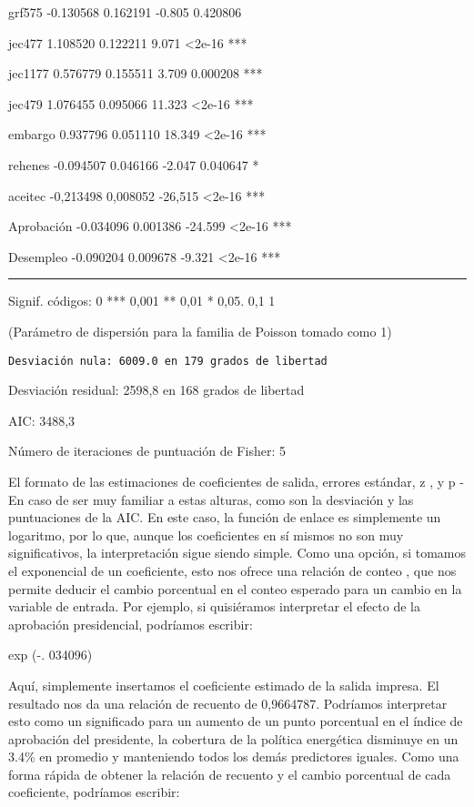 \documentclass[
]{book}
\begin{document}
grf575 -0.130568 0.162191 -0.805 0.420806

jec477 1.108520 0.122211 9.071 \textless2e-16 ***

jec1177 0.576779 0.155511 3.709 0.000208 ***

jec479 1.076455 0.095066 11.323 \textless2e-16 ***

embargo 0.937796 0.051110 18.349 \textless2e-16 ***

rehenes -0.094507 0.046166 -2.047 0.040647 *

aceitec -0,213498 0,008052 -26,515 \textless2e-16 ***

Aprobación -0.034096 0.001386 -24.599 \textless2e-16 ***

Desempleo -0.090204 0.009678 -9.321 \textless2e-16 ***

\begin{center}\rule{0.5\linewidth}{0.5pt}\end{center}

Signif. códigos: 0 *** 0,001 ** 0,01 * 0,05. 0,1 1

(Parámetro de dispersión para la familia de Poisson tomado como 1)

\begin{verbatim}
Desviación nula: 6009.0 en 179 grados de libertad
\end{verbatim}

Desviación residual: 2598,8 en 168 grados de libertad

AIC: 3488,3

Número de iteraciones de puntuación de Fisher: 5

El formato de las estimaciones de coeficientes de salida, errores estándar, z , y p -En caso de ser muy familiar a estas alturas, como son la desviación y las puntuaciones de la AIC. En este caso, la función de enlace es simplemente un logaritmo, por lo que, aunque los coeficientes en sí mismos no son muy significativos, la interpretación sigue siendo simple. Como una opción, si tomamos el exponencial de un coeficiente, esto nos ofrece una relación de conteo , que nos permite deducir el cambio porcentual en el conteo esperado para un cambio en la variable de entrada. Por ejemplo, si quisiéramos interpretar el efecto de la aprobación presidencial, podríamos escribir:

exp (-. 034096)

Aquí, simplemente insertamos el coeficiente estimado de la salida impresa. El resultado nos da una relación de recuento de 0,9664787. Podríamos interpretar esto como un significado para un aumento de un punto porcentual en el índice de aprobación del presidente, la cobertura de la política energética disminuye en un 3.4\% en promedio y manteniendo todos los demás predictores iguales. Como una forma rápida de obtener la relación de recuento y el cambio porcentual de cada coeficiente, podríamos escribir:
\end{document}
